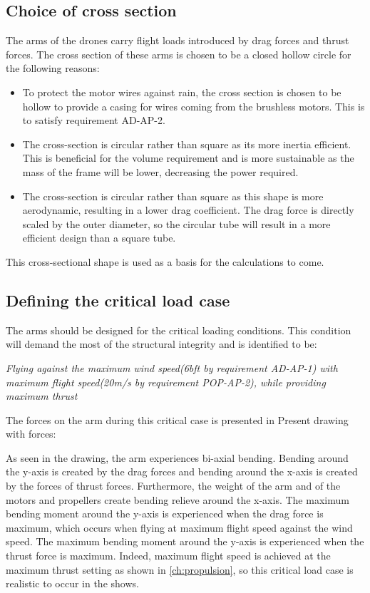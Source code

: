 \subsection{Choice of cross section}

The arms of the drones carry flight loads introduced by drag forces and thrust forces. The cross section of these arms is chosen to be a closed hollow circle for the following reasons:
\begin{itemize}[noitemsep,nolistsep]
    \item To protect the motor wires against rain, the cross section is chosen to be hollow to provide a casing for wires coming from the brushless motors. This is to satisfy requirement AD-AP-2.
    \item The cross-section is circular rather than square as its more inertia efficient. This is beneficial for the volume requirement and is more sustainable as the mass of the frame will be lower, decreasing the power required.
    \item The cross-section is circular rather than square as this shape is more aerodynamic, resulting in a lower drag coefficient. The drag force is directly scaled by the outer diameter, so the circular tube will result in a more efficient design than a square tube.
\end{itemize}

This cross-sectional shape is used as a basis for the calculations to come.

\subsection{Defining the critical load case}
\label{critical-loadcase}

The arms should be designed for the critical loading conditions. This condition will demand the most of the structural integrity and is identified to be:

\textit{Flying against the maximum wind speed(6bft by requirement AD-AP-1) with maximum flight speed(20m/s by requirement POP-AP-2), while providing maximum thrust}

The forces on the arm during this critical case is presented in %
Present drawing with forces:

As seen in the drawing, the arm experiences bi-axial bending. Bending around the y-axis is created by the drag forces and bending around the x-axis is created by the forces of thrust forces. Furthermore, the weight of the arm and of the motors and propellers create bending relieve around the x-axis. The maximum bending moment around the y-axis is experienced when the drag force is maximum, which occurs when flying at maximum flight speed against the wind speed. The maximum bending moment around the y-axis is experienced when the thrust force is maximum. Indeed, maximum flight speed is achieved at the maximum thrust setting as shown in \autoref{ch:propulsion}, so this critical load case is realistic to occur in the shows.

